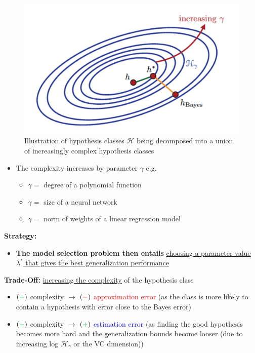 \documentclass[12pt, a4paper]{article}
\begin{document}
\begin{figure}[H]
  \centering  %
    \includegraphics[width=0.8\columnwidth]{images/complex-hypothesis-classes.png}
    \caption{Illustration of hypothesis classes $\mathcal{H}$ being decomposed into a union of increasingly complex hypothesis classes}
    \label{fig:complex-hypothesis-classes}
\end{figure}

\begin{itemize}
  \item The complexity increases by parameter $\gamma$ e.g.
  \begin{itemize}
    \item $\gamma =$ degree of a polynomial function
    \item $\gamma =$ size of a neural network
    \item $\gamma =$ norm of weights of a linear regression model
  \end{itemize}
\end{itemize}

\textbf{Strategy:}
\begin{itemize}
  \item \textbf{The model selection problem then entails} \uline{choosing a parameter value $\lambda^*$ that gives the best generalization performance}
\end{itemize}

\textbf{Trade-Off:} \uline{increasing the complexity} of the hypothesis class
\begin{itemize}
  \item $(\textcolor{Green}{+})$ complexity $\rightarrow$ $(\textcolor{red}{-})$ \textcolor{Red}{approximation error} (as the class is more likely to contain a hypothesis with error close to the Bayes error)
  \item $(\textcolor{Green}{+})$ complexity $\rightarrow$ $(\textcolor{Green}{+})$ \textcolor{blue}{estimation error} (as finding the good hypothesis becomes more hard and the generalization bounds become looser (due to increasing log $\mathcal{H}_\gamma$ or the VC dimension))
\end{itemize}
\end{document}
